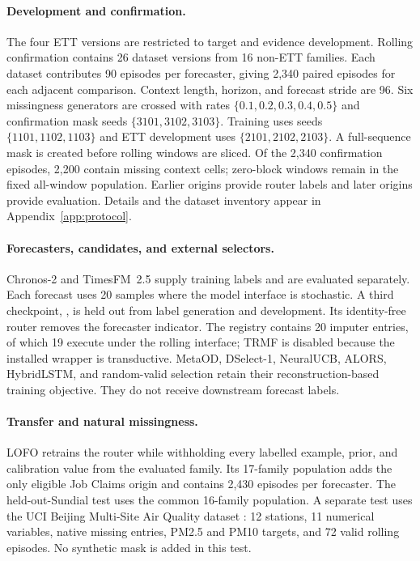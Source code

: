 \documentclass{article}
\begin{document}
\paragraph{Development and confirmation.}
The four ETT versions are restricted to target and evidence development. Rolling confirmation contains 26 dataset versions from 16 non-ETT families. Each dataset contributes 90 episodes per forecaster, giving 2,340 paired episodes for each adjacent comparison. Context length, horizon, and forecast stride are 96. Six missingness generators are crossed with rates $\{0.1,0.2,0.3,0.4,0.5\}$ and confirmation mask seeds $\{3101,3102,3103\}$. Training uses seeds $\{1101,1102,1103\}$ and ETT development uses $\{2101,2102,2103\}$. A full-sequence mask is created before rolling windows are sliced. Of the 2,340 confirmation episodes, 2,200 contain missing context cells; zero-block windows remain in the fixed all-window population. Earlier origins provide router labels and later origins provide evaluation. Details and the dataset inventory appear in Appendix~\ref{app:protocol}.

\paragraph{Forecasters, candidates, and external selectors.}
Chronos-2 and TimesFM~2.5 supply training labels and are evaluated separately. Each forecast uses 20 samples where the model interface is stochastic. A third checkpoint, , is held out from label generation and development. Its identity-free router removes the forecaster indicator. The registry contains 20 imputer entries, of which 19 execute under the rolling interface; TRMF is disabled because the installed wrapper is transductive. MetaOD, DSelect-1, NeuralUCB, ALORS, HybridLSTM, and random-valid selection retain their reconstruction-based training objective. They do not receive downstream forecast labels.

\paragraph{Transfer and natural missingness.}
LOFO retrains the router while withholding every labelled example, prior, and calibration value from the evaluated family. Its 17-family population adds the only eligible Job Claims origin and contains 2,430 episodes per forecaster. The held-out-Sundial test uses the common 16-family population. A separate test uses the UCI Beijing Multi-Site Air Quality dataset \citep{chen2017beijing}: 12 stations, 11 numerical variables, native missing entries, PM2.5 and PM10 targets, and 72 valid rolling episodes. No synthetic mask is added in this test.
\end{document}
